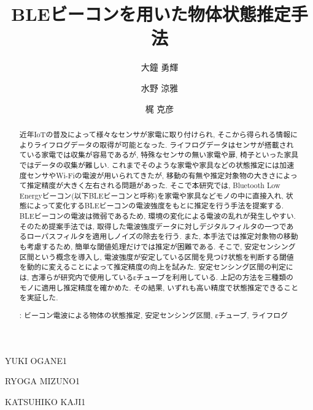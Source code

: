\documentclass[Japanese]{dicomopapers}
\begin{document}
\title{BLEビーコンを用いた物体状態推定手法}


\author{大鐘 勇輝}{YUKI OGANE}{1}
\author{水野 涼雅}{RYOGA MIZUNO}{1}
\author{梶 克彦}{KATSUHIKO KAJI}{1}




\begin{abstract}
近年IoTの普及によって様々なセンサが家電に取り付けられ, そこから得られる情報によりライフログデータの取得が可能となった.
ライフログデータはセンサが搭載されている家電では収集が容易であるが, 特殊なセンサの無い家電や扉, 椅子といった家具ではデータの収集が難しい.
これまでそのような家電や家具などの状態推定には加速度センサやWi-Fiの電波が用いられてきたが, 移動の有無や推定対象物の大きさによって推定精度が大きく左右される問題があった.
そこで本研究では, Bluetooth Low Energyビーコン(以下BLEビーコンと呼称)を家電や家具などモノの中に直接入れ, 状態によって変化するBLEビーコンの電波強度をもとに推定を行う手法を提案する.
BLEビーコンの電波は微弱であるため, 環境の変化による電波の乱れが発生しやすい.
そのため提案手法では, 取得した電波強度データに対しデジタルフィルタの一つであるローパスフィルタを適用しノイズの除去を行う.
また, 本手法では推定対象物の移動も考慮するため, 簡単な閾値処理だけでは推定が困難である.
そこで, 安定センシング区間という概念を導入し, 電波強度が安定している区間を見つけ状態を判断する閾値を動的に変えることによって推定精度の向上を試みた.
安定センシング区間の判定には, 吉澤ら\cite{ips-chube}が研究内で使用しているεチューブを利用している.
上記の方法を三種類のモノに適用し推定精度を確かめた.
その結果, いずれも高い精度で状態推定できることを実証した.

 : ビーコン電波による物体の状態推定, 安定センシング区間, εチューブ, ライフログ


\end{abstract}

\maketitle

\end{document}
